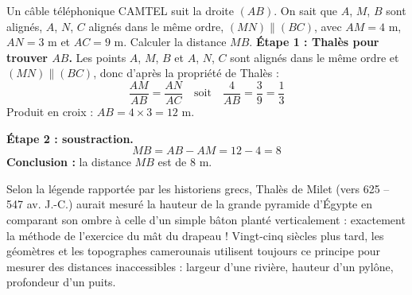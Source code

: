 \documentclass[11pt]{article}
\begin{document}
\begin{exoresolu}
Un câble téléphonique CAMTEL suit la droite $(AB)$. On sait que $A$, $M$, $B$ sont alignés, $A$, $N$, $C$ alignés dans le même ordre, $(MN) \parallel (BC)$, avec $AM = 4$ m, $AN = 3$ m et $AC = 9$ m. Calculer la distance $MB$.
\tcblower
\textbf{Étape 1 : Thalès pour trouver $AB$.} Les points $A$, $M$, $B$ et $A$, $N$, $C$ sont alignés dans le même ordre et $(MN) \parallel (BC)$, donc d'après la propriété de Thalès :
\[ \frac{AM}{AB} = \frac{AN}{AC} \quad \text{soit} \quad \frac{4}{AB} = \frac{3}{9} = \frac{1}{3} \]
Produit en croix : $AB = 4 \times 3 = 12$ m.

\textbf{Étape 2 : soustraction.}
\[ MB = AB - AM = 12 - 4 = 8 \]
\textbf{Conclusion :} la distance $MB$ est de $8$ m.
\end{exoresolu}

\begin{savaistu}
Selon la légende rapportée par les historiens grecs, Thalès de Milet (vers 625 -- 547 av. J.-C.) aurait mesuré la hauteur de la grande pyramide d'Égypte en comparant son ombre à celle d'un simple bâton planté verticalement : exactement la méthode de l'exercice du mât du drapeau ! Vingt-cinq siècles plus tard, les géomètres et les topographes camerounais utilisent toujours ce principe pour mesurer des distances inaccessibles : largeur d'une rivière, hauteur d'un pylône, profondeur d'un puits.
\end{savaistu}
\end{document}
